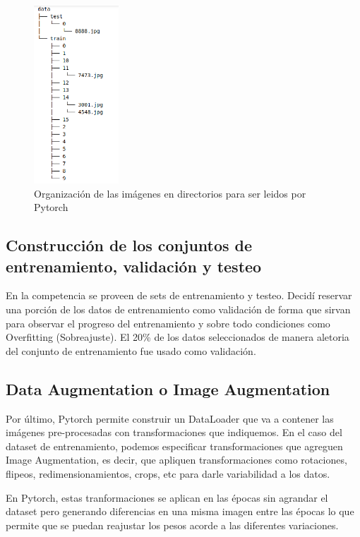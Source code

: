 \documentclass{article}
\begin{document}
\begin{figure}
  \begin{center}
    \includegraphics[width=120px]{img/directories.png}
    \caption{Organización de las imágenes en directorios para ser leidos por Pytorch}
    \label{directories}
  \end{center}
\end{figure}

 

\subsection{Construcción de los conjuntos de entrenamiento, validación y testeo}

En la competencia se proveen de sets de entrenamiento y testeo. Decidí reservar una porción de los datos de entrenamiento como validación de forma que sirvan para observar el progreso del entrenamiento y sobre todo condiciones como Overfitting (Sobreajuste). El 20\% de los datos seleccionados de manera aletoria del conjunto de entrenamiento fue usado como validación.

\subsection{Data Augmentation o Image Augmentation}

Por último, Pytorch permite construir un DataLoader que va a contener las imágenes pre-procesadas con transformaciones que indiquemos. En el caso del dataset de entrenamiento, podemos especificar transformaciones que agreguen Image Augmentation, es decir, que apliquen transformaciones como rotaciones, flipeos, redimensionamientos, crops, etc para darle variabilidad a los datos. 

En Pytorch, estas tranformaciones se aplican en las épocas sin agrandar el dataset pero generando diferencias en una misma imagen entre las épocas lo que permite que se puedan reajustar los pesos acorde a las diferentes variaciones. 
\end{document}
